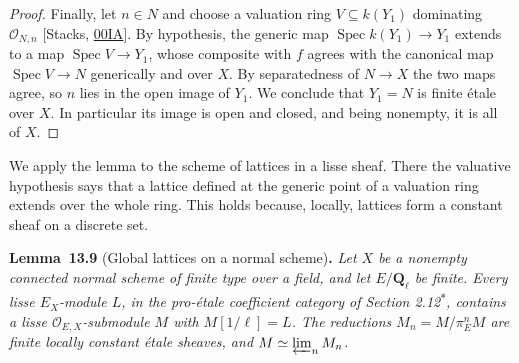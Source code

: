 \documentclass[11pt]{article}
\newenvironment{bpstatement}[2]{\par\addvspace{0.6\baselineskip}\noindent\textbf{#1}#2\textbf{.}\enspace\ignorespaces}
  {\par\addvspace{0.4\baselineskip}}
\newenvironment{bpstatementit}[2]{\begin{bpstatement}{#1}{#2}\itshape\ignorespaces}{\end{bpstatement}}
\newcommand{\bpout}[1]{#1\textsuperscript{\hyperlink{bp-outside}{\ensuremath{\ast}}}}
\begin{document}
\begin{proof}[{Proof}]
Finally, let \(n\in N\) and choose a valuation ring \(V\subseteq k(Y_1)\) dominating \(\mathcal O_{N,n}\) [Stacks, \href{https://stacks.math.columbia.edu/tag/00IA}{00IA}]. By hypothesis, the generic map \(\operatorname{Spec}k(Y_1)\to Y_1\) extends to a map \(\operatorname{Spec}V\to Y_1\), whose composite with \(f\) agrees with the canonical map \(\operatorname{Spec}V\to N\) generically and over \(X\). By separatedness of \(N\to X\) the two maps agree, so \(n\) lies in the open image of \(Y_1\). We conclude that \(Y_1=N\) is finite étale over \(X\). In particular its image is open and closed, and being nonempty, it is all of \(X\).
\end{proof}

\label{bp28}%
We apply the lemma to the scheme of lattices in a lisse sheaf. There the valuative hypothesis says that a lattice defined at the generic point of a valuation ring extends over the whole ring. This holds because, locally, lattices form a constant sheaf on a discrete set.

\label{bp29}%
\begin{bpstatementit}{Lemma~13.9}{ (Global lattices on a normal scheme)}
Let \(X\) be a nonempty connected normal scheme of finite type over a field, and let \(E/\mathbf Q_\ell\) be finite. Every lisse \(E_X\)-module \(L\), in the pro-étale coefficient category of Section \bpout{2.12}, contains a lisse \(\mathcal O_{E,X}\)-submodule \(M\) with \(M[1/\ell]=L\). The reductions \(M_n=M/\pi_E^nM\) are finite locally constant étale sheaves, and \(M\simeq\varprojlim_nM_n\).
\end{bpstatementit}
\end{document}
